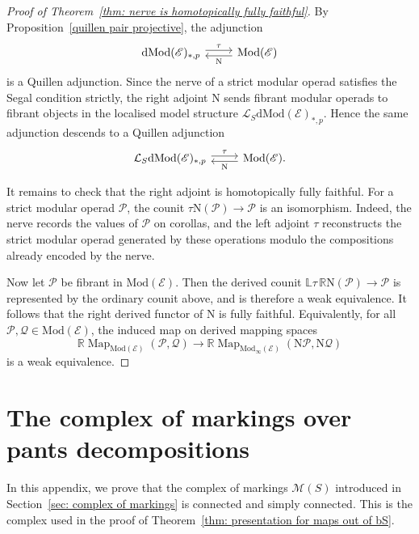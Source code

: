 \documentclass{amsart}
\newcommand{\bE}{\mathscr{E}}
\newcommand{\calQ}{\mathcal{Q}}
\newcommand{\calM}{\mathcal{M}}
\newcommand{\surf}{S}%
\newcommand{\calP}{\mathcal{P}}
\newcommand{\Mod}{\mathrm{Mod}}
\newcommand{\dMod}{\mathrm{dMod}}
\newcommand{\nerve}{\mathrm{N}}
\newcommand{\Map}{\operatorname{Map}}
\theoremstyle{definition}
\numberwithin{equation}{section}
\begin{document}
\begin{proof}[Proof of Theorem~\ref{thm: nerve is homotopically fully faithful}]
By Proposition~\ref{quillen pair projective}, the adjunction
\[
\begin{tikzcd}
\dMod(\bE)_{*,p} \arrow[r, shift left=1, "\tau"] &
\Mod(\bE) \arrow[l, shift left=1, "\nerve"]
\end{tikzcd}
\]
is a Quillen adjunction. Since the nerve of a strict modular operad satisfies the Segal condition strictly, the right adjoint $\nerve$ sends fibrant modular operads to fibrant objects in the localised model structure $\mathcal{L}_{S}\dMod(\bE)_{*,p}$. Hence the same adjunction descends to a Quillen adjunction
\[
\begin{tikzcd}
\mathcal{L}_{S}\dMod(\bE)_{*,p} \arrow[r, shift left=1, "\tau"] &
\Mod(\bE) \arrow[l, shift left=1, "\nerve"] .
\end{tikzcd}
\]

It remains to check that the right adjoint is homotopically fully faithful. For a strict modular operad $\calP$, the counit $\tau\nerve(\calP)\longrightarrow \calP$ is an isomorphism. Indeed, the nerve records the values of $\calP$ on corollas, and the left adjoint $\tau$ reconstructs the strict modular operad generated by these operations modulo the compositions already encoded by the nerve.

Now let $\calP$ be fibrant in $\Mod(\bE)$. Then the derived counit $\mathbb{L}\tau\,\mathbb{R}\nerve(\calP)\longrightarrow \calP$ is represented by the ordinary counit above, and is therefore a weak equivalence. It follows that the right derived functor of $\nerve$ is fully faithful. Equivalently, for all $\calP,\calQ\in\Mod(\bE)$, the induced map on derived mapping spaces
\[
\mathbb{R}\Map_{\Mod(\bE)}(\calP,\calQ)
\longrightarrow
\mathbb{R}\Map_{\Mod_{\infty}(\bE)}(\nerve\calP,\nerve\calQ)
\]
is a weak equivalence.
\end{proof}














\section{The complex of markings over pants decompositions}\label{app: complex of markings}
In this appendix, we prove that the complex of markings $\calM(\surf)$ introduced in Section~\ref{sec: complex of markings} is connected and simply connected. This is the complex used in the proof of Theorem~\ref{thm: presentation for maps out of bS}.
\end{document}
